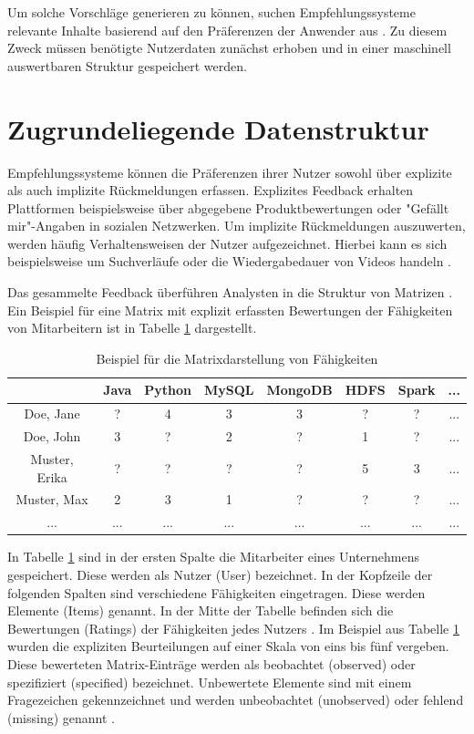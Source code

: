 Um solche Vorschläge generieren zu können, suchen Empfehlungssysteme relevante Inhalte basierend auf den Präferenzen der Anwender aus \cite[S. 1]{das:2017}. Zu diesem Zweck müssen benötigte Nutzerdaten zunächst erhoben und in einer maschinell auswertbaren Struktur gespeichert werden.

\section{Zugrundeliegende Datenstruktur}
\label{ch:empfehlungssysteme:arbeitsweise}
Empfehlungssysteme können die Präferenzen ihrer Nutzer sowohl über explizite als auch implizite Rückmeldungen erfassen. Explizites Feedback erhalten Plattformen beispielsweise über abgegebene Produktbewertungen oder "Gefällt mir"-Angaben in sozialen Netzwerken. Um implizite Rückmeldungen auszuwerten, werden häufig Verhaltensweisen der Nutzer aufgezeichnet. Hierbei kann es sich beispielsweise um Suchverläufe oder die Wiedergabedauer von Videos handeln \cite[S. 3]{pu:2012}.

Das gesammelte Feedback überführen Analysten in die Struktur von Matrizen \cite[S. 11f.]{recommenderSystems:2016}. Ein Beispiel für eine Matrix mit explizit erfassten Bewertungen der Fähigkeiten von Mitarbeitern ist in Tabelle \ref{tbl:empfehlungssysteme:arbeitsweise:tbl1} dargestellt.

\begin{table}[h]
	\centering
	\begin{tabular}{c|c|c|c|c|c|c|c}
	 & Java & Python & MySQL & MongoDB & HDFS & Spark & ...\\ 
	\hline
	Doe, Jane & ? & 4 & 3 & 3 & ? & ? & ...\\
	Doe, John & 3 & ? & 2 & ? & 1 & ? & ...\\
	Muster, Erika & ? & ? & ? & ? & 5 & 3 & ...\\
	Muster, Max & 2 & 3 & 1 & ? & ? & ? & ...\\
	... & ... & ... & ... & ... & ... & ... & ... 
	\end{tabular}
	\caption{Beispiel für die Matrixdarstellung von Fähigkeiten}
	\label{tbl:empfehlungssysteme:arbeitsweise:tbl1}
\end{table}

In Tabelle \ref{tbl:empfehlungssysteme:arbeitsweise:tbl1} sind in der ersten Spalte die Mitarbeiter eines Unternehmens gespeichert. Diese werden als Nutzer (User) bezeichnet. In der Kopfzeile der folgenden Spalten sind verschiedene Fähigkeiten eingetragen. Diese werden Elemente (Items) genannt. In der Mitte der Tabelle befinden sich die Bewertungen (Ratings) der Fähigkeiten jedes Nutzers \cite[S. 1f.]{strub:2016}. Im Beispiel aus Tabelle \ref{tbl:empfehlungssysteme:arbeitsweise:tbl1} wurden die expliziten Beurteilungen auf einer Skala von eins bis fünf vergeben. Diese bewerteten Matrix-Einträge werden  als beobachtet (observed) oder spezifiziert (specified) bezeichnet. Unbewertete Elemente sind mit einem Fragezeichen gekennzeichnet und werden unbeobachtet (unobserved) oder fehlend (missing) genannt \cite[S. 8]{recommenderSystems:2016}.

